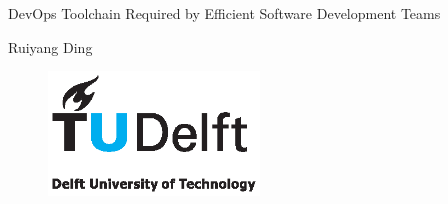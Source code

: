 \begin{titlepage}

\null\vfill

\begin{center}
\LARGE{DevOps Toolchain Required by Efficient Software Development Teams}
\end{center}

\vspace{1.5cm}

\begin{center}
Ruiyang Ding
\end{center}

\vfill

\begin{figure}[!b]
\centering
\includegraphics[width={0.5\textwidth}]{pics/TUD_logo_color.eps}
\end{figure}

\vspace{2.0cm}

\end{titlepage}

